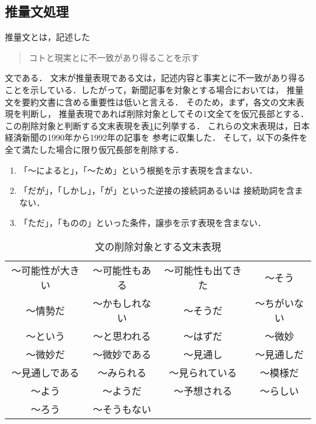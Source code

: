 \subsection{推量文処理}
推量文とは，記述した\begin{quote}
		     コトと現実とに不一致があり得ることを示す\cite{Shirota98}
		  \end{quote}
文である．
文末が推量表現である文は，記述内容と事実とに不一致があり得る
ことを示している．したがって，新聞記事を対象とする場合においては，
推量文を要約文書に含める重要性は低いと言える．
そのため，まず，各文の文末表現を判断し，
推量表現であれば削除対象としてその1文全てを仮冗長部とする．
この削除対象と判断する文末表現を表\ref{del_guess}に列挙する．
これらの文末表現は，日本経済新聞の1990年から1992年の記事を
参考に収集した．
そして，以下の条件を全て満たした場合に限り仮冗長部を削除する．
\begin{enumerate}
 \item 「〜によると」，「〜ため」という根拠を示す表現を含まない．
 \item 「だが」，「しかし」，「が」といった逆接の接続詞あるいは
       接続助詞を含まない．
 \item 「ただ」，「ものの」といった条件，譲歩を示す表現を含まない．
\end{enumerate}

\begin{small}
\begin{table}[htb]
\begin{center}
\caption{文の削除対象とする文末表現}
\label{del_guess}
\begin{tabular}{|cccc|}
\hline 
〜可能性が大きい & 〜可能性もある& 〜可能性も出てきた& 〜そう\\
 〜情勢だ& 〜かもしれない& 〜そうだ& 〜ちがいない\\ 
〜という & 〜と思われる& 〜はずだ& 〜微妙\\ 
〜微妙だ &〜微妙である & 〜見通し& 〜見通しだ\\ 
〜見通しである & 〜みられる& 〜見られている& 〜模様だ\\ 
〜よう & 〜ようだ& 〜予想される& 〜らしい\\ 
〜ろう & 〜そうもない& & \\ \hline
\end{tabular}
\end{center}
\end{table}
\end{small}

